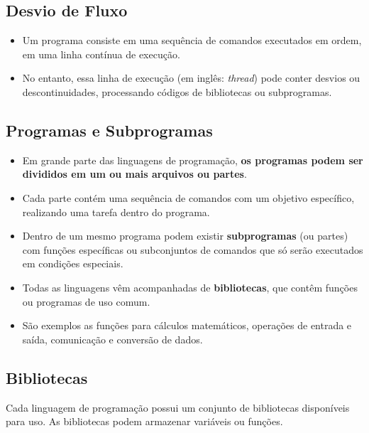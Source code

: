\documentclass[12pt,a4paper]{article}
\providecommand{\tightlist}{%
      \setlength{\itemsep}{0pt}\setlength{\parskip}{0pt}}
\begin{document}
    \hypertarget{desvio-de-fluxo}{%
\subsection{Desvio de Fluxo}\label{desvio-de-fluxo}}

    \begin{itemize}
\item
  Um programa consiste em uma sequência de comandos executados em ordem,
  em uma linha contínua de execução.
\item
  No entanto, essa linha de execução (em inglês: \emph{thread}) pode
  conter desvios ou descontinuidades, processando códigos de bibliotecas
  ou subprogramas.
\end{itemize}

    \hypertarget{programas-e-subprogramas}{%
\subsection{Programas e Subprogramas}\label{programas-e-subprogramas}}

    \begin{itemize}
\tightlist
\item
  Em grande parte das linguagens de programação, \textbf{os programas
  podem ser divididos em um ou mais arquivos ou partes}.
\item
  Cada parte contém uma sequência de comandos com um objetivo
  específico, realizando uma tarefa dentro do programa.
\item
  Dentro de um mesmo programa podem existir \textbf{subprogramas} (ou
  partes) com funções específicas ou subconjuntos de comandos que só
  serão executados em condições especiais.
\item
  Todas as linguagens vêm acompanhadas de \textbf{bibliotecas}, que
  contêm funções ou programas de uso comum.
\item
  São exemplos as funções para cálculos matemáticos, operações de
  entrada e saída, comunicação e conversão de dados.
\end{itemize}

    \hypertarget{bibliotecas}{%
\subsection{Bibliotecas}\label{bibliotecas}}

    Cada linguagem de programação possui um conjunto de bibliotecas
disponíveis para uso. As bibliotecas podem armazenar variáveis ou
funções.
\end{document}
